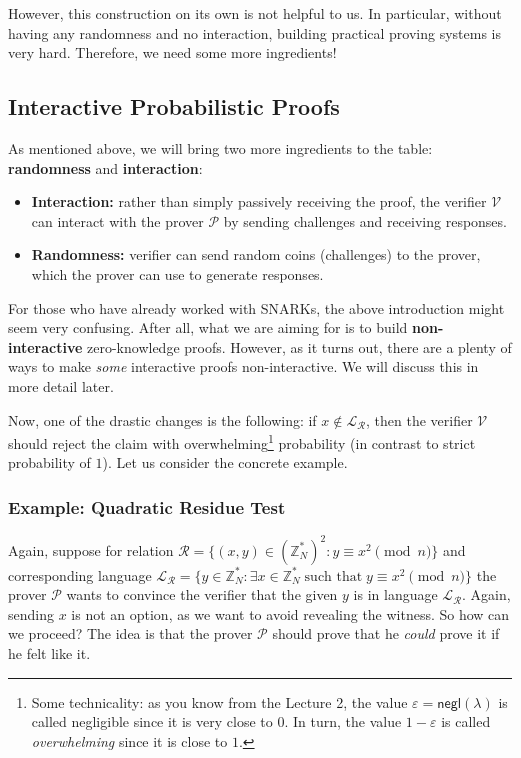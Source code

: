 \documentclass[../lecture-notes.tex]{subfiles}
\begin{document}
However, this construction on its own is not helpful to us. In particular, without having any randomness and no interaction, building practical proving systems is very hard. Therefore, we need some more ingredients!

\subsection{Interactive Probabilistic Proofs}

As mentioned above, we will bring two more ingredients to the table: \textbf{randomness} and \textbf{interaction}:
\begin{itemize}
    \item \textbf{Interaction:} rather than simply passively receiving the proof, the verifier $\mathcal{V}$ can interact with the prover $\mathcal{P}$ by sending challenges and receiving responses.
    \item \textbf{Randomness:} verifier can send random coins (challenges) to the prover, which the prover can use to generate responses.
\end{itemize}

\begin{remark}
    For those who have already worked with SNARKs, the above introduction might seem very confusing. After all, what we are aiming for is to build \textbf{non-interactive} zero-knowledge proofs. However, as it turns out, there are a plenty of ways to make \textit{some} interactive proofs non-interactive. We will discuss this in more detail later.
\end{remark}

Now, one of the drastic changes is the following: if $x \not\in \mathcal{L}_{\mathcal{R}}$, then the verifier $\mathcal{V}$ should reject the claim with overwhelming\footnote{Some technicality: as you know from the Lecture 2, the value $\varepsilon = \mathsf{negl}(\lambda)$ is called negligible since it is very close to $0$. In turn, the value $1-\varepsilon$ is called \textit{overwhelming} since it is close to $1$.} probability (in contrast to strict probability of $1$). Let us consider the concrete example.

\subsubsection{Example: Quadratic Residue Test}

Again, suppose for relation $\mathcal{R} = \{(x,y) \in (\mathbb{Z}_N^*)^2: y \equiv x^2 \pmod{n}\}$ and corresponding language $\mathcal{L}_{\mathcal{R}} = \{y \in \mathbb{Z}_N^*: \exists x \in \mathbb{Z}_N^* \; \text{such that} \; y \equiv x^2 \pmod{n}\}$ the prover $\mathcal{P}$ wants to convince the verifier that the given $y$ is in language $\mathcal{L}_{\mathcal{R}}$. Again, sending $x$ is not an option, as we want to avoid revealing the witness. So how can we proceed? The idea is that the prover $\mathcal{P}$ should prove that he \textit{could} prove it if he felt like it. 
\end{document}
